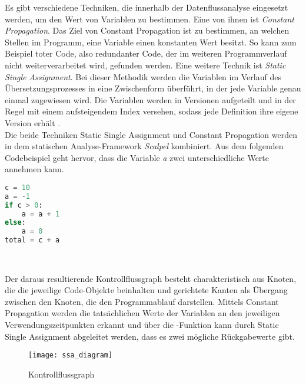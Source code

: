 \documentclass[german,bachelor]{swsLeipzig}
\begin{document}
Es gibt verschiedene Techniken, die innerhalb der Datenflussanalyse eingesetzt werden, um den Wert von Variablen zu bestimmen.
Eine von ihnen ist \textit{Constant Propagation}.
Das Ziel von Constant Propagation ist zu bestimmen, an welchen Stellen im Programm, eine Variable einen konstanten Wert besitzt.
So kann zum Beispiel toter Code, also redundanter Code, der im weiteren Programmverlauf nicht weiterverarbeitet wird, gefunden werden.
Eine weitere Technik ist \textit{Static Single Assignment}.
Bei dieser Methodik werden die Variablen im Verlauf des Übersetzungsprozesses in eine Zwischenform überführt, in der jede Variable
genau einmal zugewiesen wird.
Die Variablen werden in Versionen aufgeteilt und in der Regel mit einem aufsteigendem Index versehen,
sodass jede Definition ihre eigene Version erhält \cite[]{li2022scalpel}.\\

Die beide Techniken Static Single Assignment und Constant Propagation werden in dem statischen Analyse-Framework
\textit{Scalpel} kombiniert.
Aus dem folgenden Codebeispiel geht hervor, dass die Variable \textit{a} zwei unterschiedliche Werte annehmen kann.\\

\noindent\begin{minipage}{\linewidth}
\begin{lstlisting}[language=Python, frame=single, basicstyle=\small, caption={Codebeispiel von Scalpel für Datenflussanalyse {\cite[]{li2022scalpel}}},captionpos=b]
c = 10
a = -1
if c > 0:
    a = a + 1
else:
    a = 0
total = c + a
\end{lstlisting}
\end{minipage}
\

Der daraus resultierende Kontrollflussgraph besteht charakteristisch aus Knoten, die die jeweilige Code-Objekte beinhalten und gerichtete Kanten als Übergang
zwischen den Knoten, die den Programmablauf darstellen.
Mittels Constant Propagation werden die tatsächlichen Werte der Variablen an den jeweiligen Verwendungszeitpunkten erkannt
und über die \textPhi-Funktion kann durch Static Single Assignment abgeleitet werden, dass es zwei mögliche Rückgabewerte gibt.

\begin{figure}[h]
 \centering
 \texttt{[image: ssa\_diagram]}
 \caption{Kontrollflussgraph \cite[]{li2022scalpel}}
 \label{fig:scalpel}
\end{figure}
\end{document}
